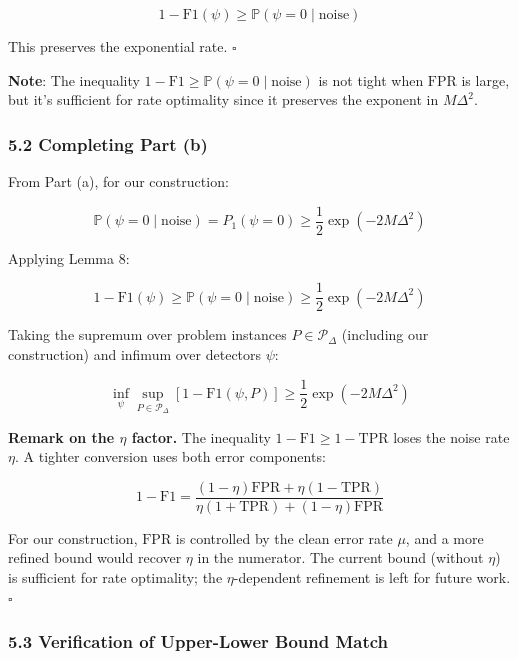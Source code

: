 \documentclass[
  12pt,
]{ctexart}
\begin{document}
\[1 - \text{F1}(\psi) \geq \mathbb{P}(\psi=0 \mid \text{noise})\]

This preserves the exponential rate. \(\square\)

\textbf{Note}: The inequality
\(1 - \text{F1} \geq \mathbb{P}(\psi=0 \mid \text{noise})\) is not tight
when \(\text{FPR}\) is large, but it's sufficient for rate optimality
since it preserves the exponent in \(M\Delta^2\).

\subsubsection{5.2 Completing Part (b)}\label{completing-part-b}

From Part (a), for our construction:

\[\mathbb{P}(\psi=0 \mid \text{noise}) = P_1(\psi=0) \geq \frac{1}{2}\exp(-2M\Delta^2)\]

Applying Lemma 8:

\[1 - \text{F1}(\psi) \geq \mathbb{P}(\psi=0 \mid \text{noise}) \geq \frac{1}{2}\exp(-2M\Delta^2)\]

Taking the supremum over problem instances \(P \in \mathcal{P}_\Delta\)
(including our construction) and infimum over detectors \(\psi\):

\[\inf_{\psi} \sup_{P \in \mathcal{P}_\Delta} [1 - \text{F1}(\psi, P)] \geq \frac{1}{2}\exp(-2M\Delta^2)\]

\textbf{Remark on the \(\eta\) factor.} The inequality
\(1-\text{F1} \geq 1-\text{TPR}\) loses the noise rate \(\eta\). A
tighter conversion uses both error components:

\[1 - \text{F1} = \frac{(1-\eta)\text{FPR} + \eta(1-\text{TPR})}{\eta(1+\text{TPR}) + (1-\eta)\text{FPR}}\]

For our construction, \(\text{FPR}\) is controlled by the clean error
rate \(\mu\), and a more refined bound would recover \(\eta\) in the
numerator. The current bound (without \(\eta\)) is sufficient for rate
optimality; the \(\eta\)-dependent refinement is left for future work.
\(\square\)

\subsubsection{5.3 Verification of Upper-Lower Bound
Match}\label{verification-of-upper-lower-bound-match}
\end{document}
